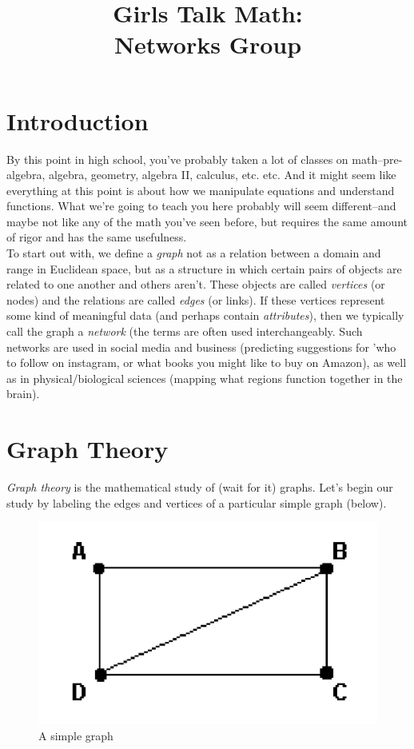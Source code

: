 \documentclass[12pt]{article}
\title{Girls Talk Math: \\Networks Group}
\author{}
\date{}
\begin{document}
\maketitle

\section{Introduction}
By this point in high school, you've probably taken a lot of classes on math--pre-algebra, algebra, geometry, algebra II, calculus, etc. etc. And it might seem like everything at this point is about how we manipulate equations and understand functions. What we're going to teach you here probably will seem different--and maybe not like any of the math you've seen before, but requires the same amount of rigor and has the same usefulness. 
\\
To start out with, we define a \emph{graph} not as a relation between a domain and range in Euclidean space, but as a structure in which certain pairs of objects are related to one another and others aren't. These objects are called \emph{vertices} (or nodes) and the relations are called \emph{edges} (or links). If these vertices represent some kind of meaningful data (and perhaps contain \emph{attributes}), then we typically call the graph a \emph{network} (the terms are often used interchangeably. Such networks are used in social media and business (predicting suggestions for 'who to follow on instagram, or what books you might like to buy on Amazon), as well as in physical/biological sciences (mapping what regions function together in the brain).
\section{Graph Theory}
\emph{Graph theory} is the mathematical study of (wait for it) graphs. Let's begin our study by labeling the edges and vertices of a particular simple graph (below).

\begin{figure}[htbp]
\begin{center}
\includegraphics[]{abcd.png}
\caption{A simple graph}
\label{default}
\end{center}
\end{figure}
\end{document}
